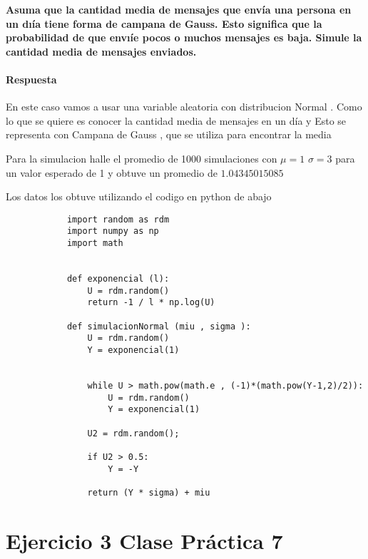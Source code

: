 \documentclass{article}
\begin{document}
    \begin{flushleft}
        {\bf Asuma que la cantidad media de mensajes que env\'ia una persona en un
        dı\'ia tiene forma de campana de Gauss. Esto significa que la probabilidad de que envı\'ie
        pocos o muchos mensajes es baja. Simule la cantidad media de mensajes enviados. }


        \paragraph{Respuesta }En este caso vamos a usar una variable aleatoria con distribucion Normal .
        Como lo que se quiere es conocer la cantidad media de mensajes en un d\'ia y Esto se representa con 
        Campana de Gauss , que se utiliza para encontrar la media 

        
        Para la simulacion halle el promedio de 1000 simulaciones con $\mu = 1 $ $ \sigma = 3$ para un 
        valor esperado de 1 y obtuve un promedio de $1.04345015085$

        Los datos los obtuve utilizando el codigo en python de abajo 


        \begin{verbatim}
            import random as rdm
            import numpy as np  
            import math


            def exponencial (l):
                U = rdm.random()   
                return -1 / l * np.log(U) 

            def simulacionNormal (miu , sigma ):
                U = rdm.random()
                Y = exponencial(1) 

            
                while U > math.pow(math.e , (-1)*(math.pow(Y-1,2)/2)):
                    U = rdm.random() 
                    Y = exponencial(1) 

                U2 = rdm.random(); 

                if U2 > 0.5:
                    Y = -Y

                return (Y * sigma) + miu    
        \end{verbatim}
    \end{flushleft}


    \section*{Ejercicio 3 Clase Pr\'actica 7}
\end{document}
